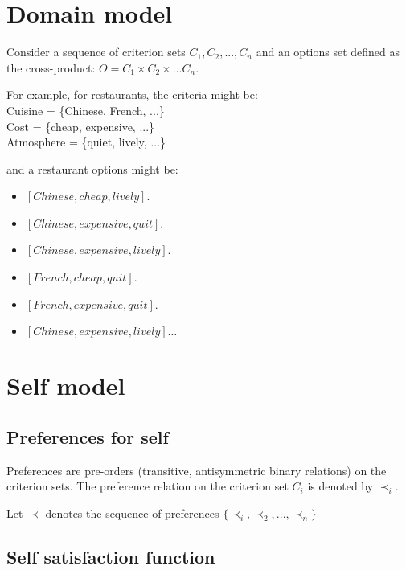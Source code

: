 \documentclass{article}
\begin{document}
		\title{\vskip -10pt}
		
		\author{Lydia Ould Ouali, Charles Rich \and
		Nicolas Sabouret }
		
	
	\section{Domain model}
		Consider a sequence of criterion sets $C_1, C_2, ..., C_n$ and an options set defined as the cross-product:
				$O = C_1 \times C_2 \times \ldots C_n$.
		
		For example, for restaurants, the criteria might be: \\
			Cuisine = \{Chinese, French, ...\} \\
			Cost = \{cheap, expensive, ...\} \\
			Atmosphere = \{quiet, lively, ...\} \\
		
	\par and a restaurant options might be: 
		\begin{itemize}
			 \item $[Chinese, cheap, lively]$. 
			 \item $[Chinese, expensive, quit]$.   
			 \item $[Chinese, expensive, lively]$.
			 \item $[French, cheap, quit]$.  
			 \item $[French, expensive, quit]$.   
			 \item $[Chinese, expensive, lively]\ldots$ 
		\end{itemize}
  
  
	\section{Self model} 
	
	\subsection{Preferences for self}
	Preferences are pre-orders (transitive, antisymmetric binary relations) on the criterion sets. The preference relation on the criterion set $C_i$ is denoted by $\prec_i$.
	
	Let $\prec$ denotes the sequence of preferences $\{ \prec_i, \prec_2, ..., \prec_n\}$
	
	\subsection{Self satisfaction function} 
	
\end{document}
